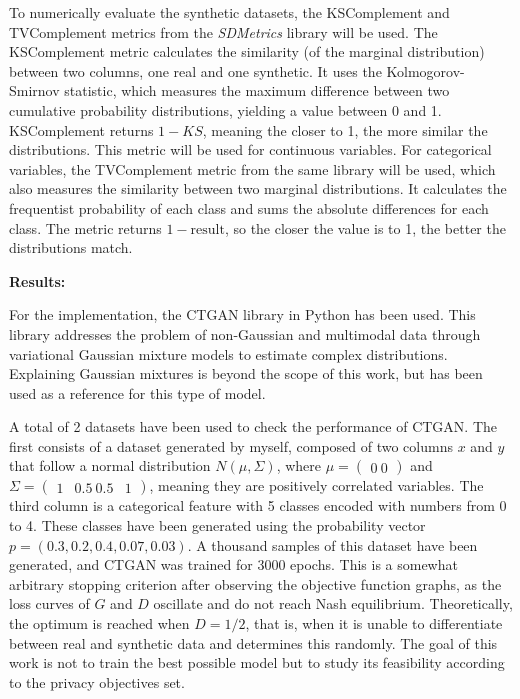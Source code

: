 To numerically evaluate the synthetic datasets, the KSComplement and TVComplement metrics from the \textit{SDMetrics} library will be used. The KSComplement metric calculates the similarity (of the marginal distribution) between two columns, one real and one synthetic. It uses the Kolmogorov-Smirnov statistic, which measures the maximum difference between two cumulative probability distributions, yielding a value between 0 and 1. KSComplement returns $1-KS$, meaning the closer to 1, the more similar the distributions. This metric will be used for continuous variables. For categorical variables, the TVComplement metric from the same library will be used, which also measures the similarity between two marginal distributions. It calculates the frequentist probability of each class and sums the absolute differences for each class. The metric returns $1-\text{result}$, so the closer the value is to 1, the better the distributions match.

\textbf{Results:}

For the implementation, the CTGAN library in Python has been used. This library addresses the problem of non-Gaussian and multimodal data through variational Gaussian mixture models to estimate complex distributions. Explaining Gaussian mixtures is beyond the scope of this work, but \cite*{bishop2006} has been used as a reference for this type of model.

A total of 2 datasets have been used to check the performance of CTGAN. The first consists of a dataset generated by myself, composed of two columns $x$ and $y$ that follow a normal distribution $N(\mu, \Sigma)$, where $\mu = \begin{pmatrix}
0 \
0
\end{pmatrix}$ and $\Sigma = \begin{pmatrix}
1 & 0.5 \
0.5 & 1
\end{pmatrix}$, meaning they are positively correlated variables. The third column is a categorical feature with 5 classes encoded with numbers from 0 to 4. These classes have been generated using the probability vector $p=(0.3, 0.2, 0.4, 0.07, 0.03)$. A thousand samples of this dataset have been generated, and CTGAN was trained for 3000 epochs. This is a somewhat arbitrary stopping criterion after observing the objective function graphs, as the loss curves of $G$ and $D$ oscillate and do not reach Nash equilibrium. Theoretically, the optimum is reached when $D = 1/2$, that is, when it is unable to differentiate between real and synthetic data and determines this randomly. The goal of this work is not to train the best possible model but to study its feasibility according to the privacy objectives set.

